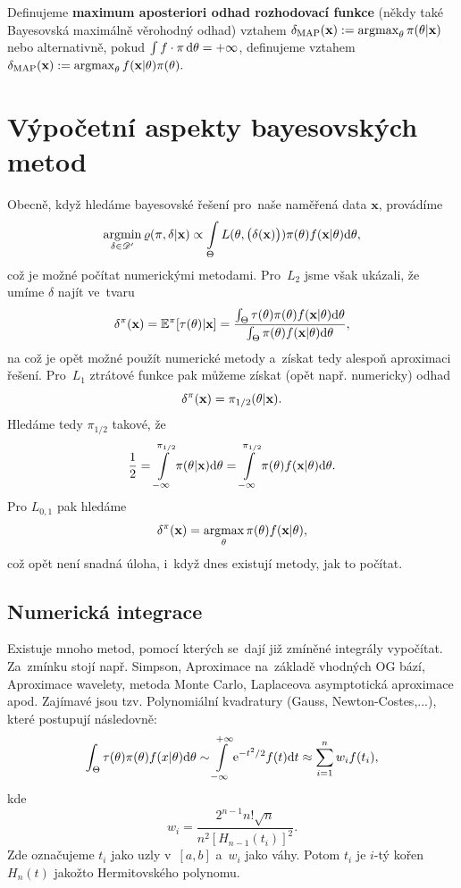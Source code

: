\begin{define}
	Definujeme \textbf{maximum aposteriori odhad rozhodovací funkce} (někdy také Bayesovská maximálně věrohodný odhad) vztahem $\delta_\mathrm{MAP}(\textbf{x}):=\mathop{\mathrm{argmax}}_\theta \pi(\theta|\textbf{x})$ nebo alternativně, pokud $\int f\cdot\pi\,\mathrm{d}\theta=+\infty$, definujeme vztahem  $\delta_\mathrm{MAP}(\textbf{x}):=\mathop{\mathrm{argmax}}_\theta f(\textbf{x}|\theta)\pi(\theta).$
\end{define}

\chapter{Výpočetní aspekty bayesovských metod}
Obecně, když hledáme bayesovské řešení pro~naše naměřená data $\textbf{x}$, provádíme 
$$ \mathop{\mathrm{argmin}}\limits_{\delta\in\mathscr{D}'} \varrho(\pi,\delta|\textbf{x})\propto \int\limits_\Theta L(\theta,\big(\delta(\textbf{x})\big))\pi(\theta)f(\textbf{x}|\theta)\mathrm{d}\theta,$$
což je možné počítat numerickými metodami. Pro~$L_2$ jsme však ukázali, že umíme $\delta$ najít ve~tvaru
$$ \delta^\pi(\textbf{x})=\mathbb{E}^\pi[\tau(\theta)|\textbf{x}]=\frac{\int_\Theta \tau(\theta)\pi(\theta)f(\textbf{x}|\theta)\mathrm{d}\theta}{\int_\Theta \pi(\theta)f(\textbf{x}|\theta)\mathrm{d}\theta},$$
na což je opět možné použít numerické metody a~získat tedy alespoň aproximaci řešení. Pro~$L_1$ ztrátové funkce pak můžeme získat (opět např. numericky) odhad
$$ \delta^\pi(\textbf{x})=\pi_{1/2}(\theta|\textbf{x}).$$
Hledáme tedy $\pi_{1/2}$ takové, že 
$$ \frac{1}{2}=\int\limits_{-\infty}^{\pi_{1/2}}\pi(\theta|\textbf{x})\mathrm{d}\theta=\int\limits_{-\infty}^{\pi_{1/2}}\pi(\theta)f(\textbf{x}|\theta)\mathrm{d}\theta.$$
Pro $L_{0,1}$ pak hledáme
$$ \delta^\pi(\textbf{x})=\mathop{\mathrm{argmax}}\limits_{\theta}\pi(\theta)f(\textbf{x}|\theta), $$
což opět není snadná úloha, i~když dnes existují metody, jak to počítat.

\section{Numerická integrace}
Existuje mnoho metod, pomocí kterých se~dají již zmíněné integrály vypočítat. Za~zmínku stojí např. Simpson, Aproximace na~základě vhodných OG bází, Aproximace wavelety, metoda Monte Carlo, Laplaceova asymptotická aproximace apod. Zajímavé jsou tzv. Polynomiální kvadratury (Gauss, Newton-Costes,...), které postupují následovně:
$$ \int_\Theta \tau(\theta)\pi(\theta)f(x|\theta)\mathrm{d}\theta\sim\int\limits_{-\infty}^{+\infty}\mathrm{e}^{-t^2/2}f(t)\mathrm{d} t\approx \sum\limits_{i=1}^{n} w_i f(t_i), $$
kde $$ w_i=\frac{2^{n-1}n!\sqrt{n}}{n^2[H_{n-1}(t_i)]^2}.$$
Zde označujeme $t_i$ jako uzly v~$[a,b]$ a~$w_i$ jako váhy. Potom $t_i$ je $i$-tý kořen $H_n(t)$ jakožto Hermitovského polynomu.



